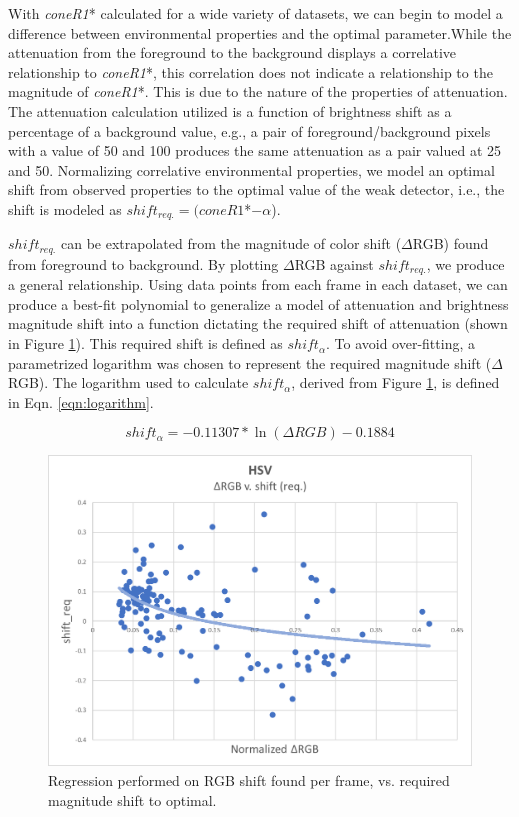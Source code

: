 With \textit{coneR1}* calculated for a wide variety of datasets, we can begin to model a difference between environmental properties and the optimal parameter.While the attenuation from the foreground to the background displays a correlative relationship to \textit{coneR1}*, this correlation does not indicate a relationship to the magnitude of \textit{coneR1}*. This is due to the nature of the properties of attenuation. The attenuation calculation utilized is a function of brightness shift as a percentage of a background value, e.g., a pair of foreground/background pixels with a value of 50 and 100 produces the same attenuation as a pair valued at 25 and 50. Normalizing correlative environmental properties, we model an optimal shift from observed properties to the optimal value of the weak detector, i.e., the shift is modeled as $shift_{req.} = (coneR1$*$ - \alpha$).

$shift_{req.}$ can be extrapolated from the magnitude of color shift ($\Delta$RGB) found from foreground to background. By plotting $\Delta$RGB against $shift_{req.}$, we produce a general relationship. Using data points from each frame in each dataset, we can produce a best-fit polynomial to generalize a model of attenuation and brightness magnitude shift into a function dictating the required shift of attenuation (shown in Figure \ref{fig:polyfit}). This required shift is defined as $shift_{\alpha}$. To avoid over-fitting, a parametrized logarithm was chosen to represent the required magnitude shift ($\Delta$RGB). The logarithm used to calculate $shift_{\alpha}$, derived from Figure \ref{fig:polyfit}, is defined in Eqn. \ref{eqn:logarithm}.

\begin{equation}
shift_{\alpha} = -0.11307*\ln(\Delta RGB) - 0.1884 
\label{eqn:logarithm}
\end{equation}

\begin{figure}
  \centering
  \includegraphics[width=.8\linewidth]{figures/model_hsv.jpg}
  \caption{Regression performed on RGB shift found per frame, vs. required magnitude shift to optimal.}
  \label{fig:polyfit}
\end{figure}

